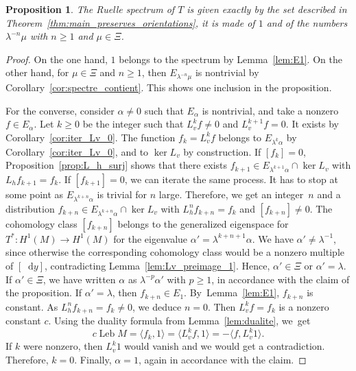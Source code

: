 \documentclass[10pt]{amsart}
\newcommand{\dd}{\mathop{}\!\mathrm{d}}
\DeclareMathOperator{\Leb}{Leb}
\newtheorem{prop}[thm]{Proposition}
\theoremstyle{definition}
\numberwithin{equation}{section}
\begin{document}
\begin{prop}
\label{prop:partiel} The Ruelle spectrum of $T$ is given exactly by the set
described in Theorem~\ref{thm:main_preserves_orientations}, \ie it is made
of $1$ and of the numbers $\lambda^{-n} \mu$ with $n\geq 1$ and $\mu \in
\Xi$.
\end{prop}
\begin{proof}
On the one hand, $1$ belongs to the spectrum by Lemma~\ref{lem:E1}. On the
other hand, for $\mu \in \Xi$ and $n\geq 1$, then $E_{\lambda^{-n} \mu}$ is
nontrivial by Corollary~\ref{cor:spectre_contient}. This shows one inclusion
in the proposition.

For the converse, consider $\alpha\neq 0$ such that $E_\alpha$ is nontrivial,
and take a nonzero $f \in E_\alpha$. Let $k\geq 0$ be the integer such that
$L_v^k f \neq 0$ and $L_v^{k+1}f=0$. It exists by
Corollary~\ref{cor:iter_Lv_0}. The function $f_k = L_v^k f$ belongs to
$E_{\lambda^k \alpha}$ by Corollary~\ref{cor:iter_Lv_0}, and to $\ker L_v$ by
construction. If $[f_k] = 0$, Proposition~\ref{prop:L_h_surj} shows that
there exists $f_{k+1} \in E_{\lambda^{k+1}\alpha} \cap \ker L_v$ with $L_h
f_{k+1} = f_k$. If $[f_{k+1}] = 0$, we can iterate the same process. It has
to stop at some point as $E_{\lambda^{k+n} \alpha}$ is trivial for $n$ large.
Therefore, we get an integer~$n$ and a distribution $f_{k+n} \in
E_{\lambda^{k+n} \alpha} \cap \ker L_v$ with $L_h^n f_{k+n} = f_k$ and
$[f_{k+n}] \neq 0$. The cohomology class $[f_{k+n}]$ belongs to the
generalized eigenspace for $T^*: H^1(M) \to H^1(M)$ for the eigenvalue
$\alpha' = \lambda^{k+n+1} \alpha$. We have $\alpha' \neq \lambda^{-1}$,
since otherwise the corresponding cohomology class would be a nonzero
multiple of $[\dd y]$, contradicting Lemma~\ref{lem:Lv_preimage_1}. Hence,
$\alpha' \in \Xi$ or $\alpha' = \lambda$. If $\alpha' \in \Xi$, we have
written $\alpha$ as $\lambda^{-p} \alpha'$ with $p\geq 1$, in accordance with
the claim of the proposition. If $\alpha' = \lambda$, then $f_{k+n} \in E_1$.
By~Lemma~\ref{lem:E1}, $f_{k+n}$ is constant. As $L_h^n f_{k+n} = f_k \neq
0$, we deduce $n = 0$. Then $L_v^k f = f_k$ is a nonzero constant $c$. Using
the duality formula from Lemma~\ref{lem:dualite}, we~get
\begin{equation*}
c \Leb M = \langle f_k, 1 \rangle = \langle L_v^k f, 1 \rangle
= - \langle f, L_v^k 1 \rangle.
\end{equation*}
If $k$ were nonzero, then $L_v^k 1$ would vanish and we would get a
contradiction. Therefore, $k=0$. Finally, $\alpha=1$, again in accordance
with the claim.
\end{proof}
\end{document}
